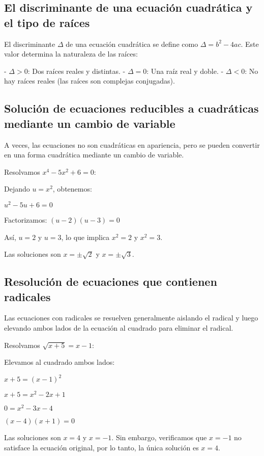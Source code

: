 \subsection{El discriminante de una ecuación cuadrática y el tipo de raíces}

El discriminante \( \Delta \) de una ecuación cuadrática se define como \( \Delta = b^2 - 4ac \). Este valor determina la naturaleza de las raíces:

- \( \Delta > 0 \): Dos raíces reales y distintas.
- \( \Delta = 0 \): Una raíz real y doble.
- \( \Delta < 0 \): No hay raíces reales (las raíces son complejas conjugadas).

\subsection{Solución de ecuaciones reducibles a cuadráticas mediante un cambio de variable}

A veces, las ecuaciones no son cuadráticas en apariencia, pero se pueden convertir en una forma cuadrática mediante un cambio de variable.

\begin{example}
Resolvamos \( x^4 - 5x^2 + 6 = 0 \):

Dejando \( u = x^2 \), obtenemos:

\( u^2 - 5u + 6 = 0 \)

Factorizamos: \( (u - 2)(u - 3) = 0 \)

Así, \( u = 2 \) y \( u = 3 \), lo que implica \( x^2 = 2 \) y \( x^2 = 3 \).

Las soluciones son \( x = \pm \sqrt{2} \) y \( x = \pm \sqrt{3} \).
\end{example}

\subsection{Resolución de ecuaciones que contienen radicales}

Las ecuaciones con radicales se resuelven generalmente aislando el radical y luego elevando ambos lados de la ecuación al cuadrado para eliminar el radical.

\begin{example}
Resolvamos \( \sqrt{x + 5} = x - 1 \):

Elevamos al cuadrado ambos lados:

\( x + 5 = (x - 1)^2 \)

\( x + 5 = x^2 - 2x + 1 \)

\( 0 = x^2 - 3x - 4 \)

\( (x - 4)(x + 1) = 0 \)

Las soluciones son \( x = 4 \) y \( x = -1 \). Sin embargo, verificamos que \( x = -1 \) no satisface la ecuación original, por lo tanto, la única solución es \( x = 4 \).
\end{example}
 



